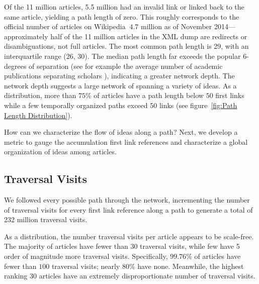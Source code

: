 \documentclass[pre,twocolumn,twoside,superscriptaddress,floatfix, aps, 10pt]{revtex4-1}
\begin{document}
Of the 11 million articles, 5.5 million had an invalid link or linked back to the same article, yielding a path length of zero. 
This roughly corresponds to the official number of articles on Wikipedia 
$~4.7$ million as of November 2014---approximately half of the 11 million 
articles in the XML dump are redirects or disambiguations, not full articles.
The most common path length is 29, with an interquartile range (26, 30).
The median path length far exceeds the popular 6-degrees of separation (see for 
example the average number of academic publications separating scholars 
\cite{six_degrees}), indicating a greater network depth. The network depth suggests a large network of spanning a variety of ideas.
As a distribution, more than $75\%$ of articles have a path length below 
$50$ first links 
while a few temporally organized paths exceed 50 links 
(see figure~\ref{fig:Path Length Distribution}). 

How can we characterize the flow of ideas along a path? Next, we develop 
a metric to gauge the accumulation first link references
and characterize a global organization 
of ideas among articles.




\subsection{Traversal Visits}

We followed every possible path through the network, incrementing
the number of traversal visits for every first link reference along a path 
to generate a total of 232 million traversal visits.

As a distribution, the number traversal visits per article appears to be scale-free. The majority of articles have fewer than 30 traversal visits, while few 
have 5 order of magnitude more traversal visits. 
Specifically, $99.76\%$ of articles have fewer than $100$ traversal visits; nearly $80\%$ have none. 
Meanwhile, the highest ranking 30 articles have an extremely disproportionate number of traversal visits.
\end{document}
